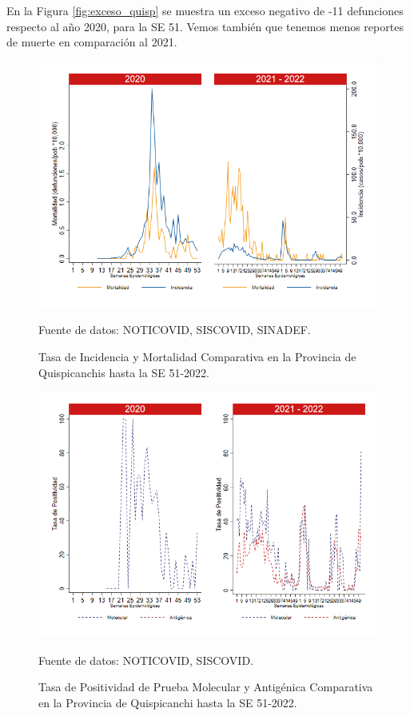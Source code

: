 \documentclass[12pt,a4paper,openany]{book}
\begin{document}
	En la Figura \ref{fig:exceso_quisp} se muestra un exceso negativo de -11 defunciones respecto al año 2020, para la SE 51. Vemos también que tenemos menos reportes de muerte en comparación al 2021. 
	
	\begin{figure}[h]
		\caption{Tasa de Incidencia y Mortalidad Comparativa en la Provincia de Quispicanchis hasta la SE 51-2022.}\label{fig:inc_mort_quisp}
		\begin{center}
			\includegraphics[width=0.85\linewidth]{../figuras/incidencia_mortalidad_20_21_12.png}
		\end{center}
		{\footnotesize {Fuente de datos: NOTICOVID, SISCOVID, SINADEF.}}
	\end{figure}
	
	\begin{figure}[h]
		\caption{Tasa de Positividad de Prueba Molecular y Antigénica Comparativa en la Provincia de Quispicanchi hasta la SE 51-2022.}\label{fig:positividad_quisp}
		\begin{center}
			\includegraphics[width=0.7\linewidth]{../figuras/positividad_20_21_12.png}
		\end{center}
		{\footnotesize {Fuente de datos: NOTICOVID, SISCOVID.}}
	\end{figure}
	
\end{document}
